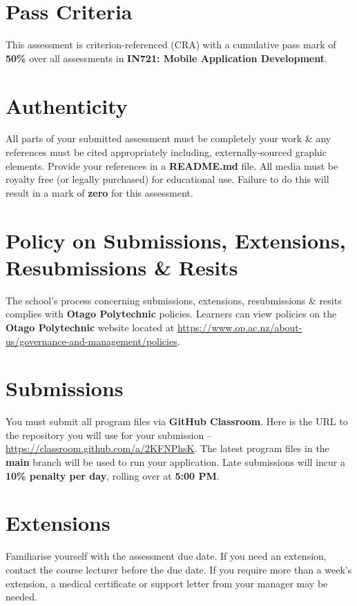 \documentclass{article}
\begin{document}
\section*{Pass Criteria}
This assessment is criterion-referenced (CRA) with a cumulative pass mark of \textbf{50\%} over all assessments in \textbf{IN721: Mobile Application Development}.

\section*{Authenticity}
All parts of your submitted assessment must be completely your work \& any references must be cited appropriately including, externally-sourced graphic elements. Provide your references in a \textbf{README.md} file. All media must be royalty free (or legally purchased) for educational use. Failure to do this will result in a mark of \textbf{zero} for this assessment.

\section*{Policy on Submissions, Extensions, Resubmissions \& Resits}
The school's process concerning submissions, extensions, resubmissions \& resits complies with \textbf{Otago Polytechnic} policies. Learners can view policies on the \textbf{Otago Polytechnic} website located at \href{https://www.op.ac.nz/about-us/governance-and-management/policies}{https://www.op.ac.nz/about-us/governance-and-management/policies}.

\section*{Submissions}
You must submit all program files via \textbf{GitHub Classroom}. Here is the URL to the repository you will use for your submission – \href{https://classroom.github.com/a/2KFNPhsK}{https://classroom.github.com/a/2KFNPhsK}. The latest program files in the \textbf{main} branch will be used to run your application. Late submissions will incur a \textbf{10\% penalty per day}, rolling over at \textbf{5:00 PM}.

\section*{Extensions}
Familiarise yourself with the assessment due date. If you need an extension, contact the course lecturer before the due date. If you require more than a week's extension, a medical certificate or support letter from your manager may be needed.
\end{document}
